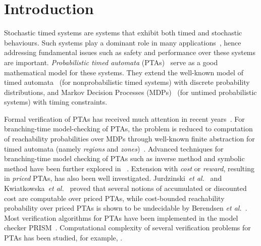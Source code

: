 \vspace{-2.5em}
\section{Introduction}
\vspace{-1em}
Stochastic timed systems are systems that exhibit both timed and stochastic behaviours.
Such systems play a dominant role in many applications~\cite{DBLP:books/daglib/0020348}, hence
addressing fundamental issues such as safety and performance over these systems are important.
\emph{Probabilistic timed automata} (PTAs)~\cite{DBLP:journals/fmsd/NormanPS13,DBLP:journals/tcs/Beauquier03,DBLP:journals/tcs/KwiatkowskaNSS02} serve as a good mathematical model for these systems.
They extend the well-known model of timed automata~\cite{DBLP:journals/tcs/AlurD94} (for nonprobabilistic timed systems) with discrete probability distributions, and Markov Decision Processes (MDPs)~\cite{PutermanMDP} (for untimed probabilistic systems) with timing constraints.

Formal verification of PTAs has received much attention in recent years~\cite{DBLP:journals/fmsd/NormanPS13}.
For branching-time model-checking of PTAs, the problem is reduced to computation of reachability probabilities over MDPs through well-known finite abstraction for timed automata (namely \emph{regions} and \emph{zones})~\cite{JensenPTA,DBLP:journals/tcs/Beauquier03,DBLP:journals/tcs/KwiatkowskaNSS02}.
Advanced techniques for branching-time model checking of PTAs such as inverse method and symbolic method have been further explored in  ~\cite{DBLP:journals/fmsd/AndreFS13,DBLP:journals/iandc/KwiatkowskaNSW07,DBLP:conf/formats/KwiatkowskaNP09,DBLP:conf/formats/JovanovicKN15}.
Extension with \emph{cost} or \emph{reward}, resulting in \emph{priced} PTAs, has also been well investigated.
Jurdzinski~\emph{et al.}~\cite{DBLP:conf/concur/JurdzinskiKNT09} and Kwiatkowska~\emph{et al.}~\cite{DBLP:journals/fmsd/KwiatkowskaNPS06} proved that several notions of accumulated or discounted cost are computable over priced PTAs, while
cost-bounded reachability probability over priced PTAs is shown to be undecidable by Berendsen \emph{et al.}~\cite{DBLP:conf/tamc/BerendsenCJ09}.
Most verification algorithms for PTAs have been implemented in the model checker PRISM~\cite{DBLP:conf/cav/KwiatkowskaNP11}. Computational complexity of several verification problems for PTAs has been studied, for example, \cite{DBLP:journals/ipl/LaroussinieS07,DBLP:journals/lmcs/JurdzinskiSL08,DBLP:conf/concur/JurdzinskiKNT09}.


